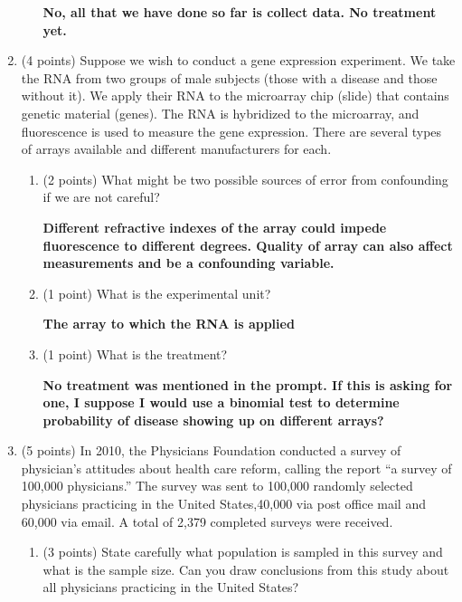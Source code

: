 \documentclass{article}
\begin{document}
\begin{enumerate}
\begin{enumerate}
	\textbf{No, all that we have done so far is collect data. No treatment yet.} \\
	
	
	
	\end{enumerate}

\item (4 points) Suppose we wish to conduct a gene expression experiment. We take the RNA from two groups of male subjects (those with a disease and those without it). We apply their RNA to the microarray chip (slide) that contains genetic material (genes). The RNA is hybridized to the microarray, and fluorescence is used to measure the gene expression. There are several types of arrays available and different manufacturers for each.
	\begin{enumerate}
	\item (2 points) What might be two possible sources of error from confounding if we are not careful?
	
	\textbf{Different refractive indexes of the array could impede fluorescence to different degrees. Quality of array can also affect measurements and be a confounding variable.} \\
	
	\item (1 point) What is the experimental unit?
	
	\textbf{The array to which the RNA is applied} \\
	
	\item (1 point) What is the treatment?
	
	\textbf{No treatment was mentioned in the prompt. If this is asking for one, I suppose I would use a binomial test to determine probability of disease showing up on different arrays?} \\
	\end{enumerate}



\item (5 points) In 2010, the Physicians Foundation conducted a survey of physician’s attitudes about health care reform, calling the report “a survey of 100,000 physicians.” The survey was sent to 100,000 randomly selected physicians practicing in the United States,40,000 via post office mail and 60,000 via email. A total of 2,379 completed surveys were received.
	\begin{enumerate}
	\item (3 points) State carefully what population is sampled in this survey and what is the sample size. Can you draw conclusions from this study about all physicians practicing in the United States?\
	

\end{enumerate}
\end{enumerate}
\end{document}
